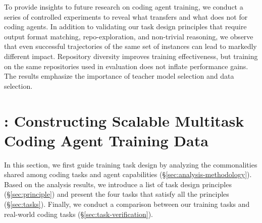 \documentclass{article}
\theoremstyle{plain}
\theoremstyle{definition}
\theoremstyle{remark}
\begin{document}
To provide insights to future research on coding agent training, we conduct a series of controlled experiments to reveal what transfers and what does not for coding agents.
In addition to validating our task design principles that require output format matching, repo-exploration, and non-trivial reasoning, we observe that even successful trajectories of the same set of instances can lead to markedly different impact.
Repository diversity improves training effectiveness, but training on the same repositories used in evaluation does not inflate performance gains.
The results emphasize the importance of teacher model selection and data selection.





\begin{table}[t]
\centering
{}
\caption{The use of Linux commands for repository exploration in our proposed training tasks (left) and downstream tasks (right). We show the percentage of each command used in the agent steps targeting repository exploration.
}
\vspace{-0.5cm}
\label{tab:cmd-category}
\end{table}








\section{\methodName: Constructing Scalable Multitask Coding Agent Training Data}
\label{sec:methodology}
In this section, we first guide training task design by analyzing the commonalities shared among coding tasks and agent capabilities (\S\ref{sec:analysis-methodology}).
Based on the analysis results, we introduce a list of task design principles (\S\ref{sec:principle}) and present the four \methodName tasks that satisfy all the principles (\S\ref{sec:tasks}).
Finally, we conduct a comparison between our training tasks and real-world coding tasks (\S\ref{sec:task-verification}).
\end{document}
